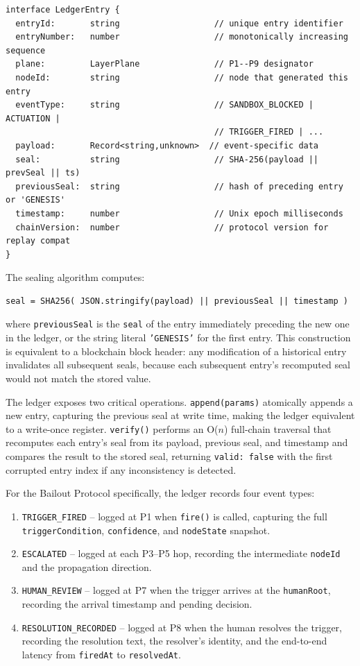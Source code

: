 \begin{verbatim}
interface LedgerEntry {
  entryId:       string                   // unique entry identifier
  entryNumber:   number                   // monotonically increasing sequence
  plane:         LayerPlane               // P1--P9 designator
  nodeId:        string                   // node that generated this entry
  eventType:     string                   // SANDBOX_BLOCKED | ACTUATION |
                                          // TRIGGER_FIRED | ...
  payload:       Record<string,unknown>  // event-specific data
  seal:          string                   // SHA-256(payload || prevSeal || ts)
  previousSeal:  string                   // hash of preceding entry or 'GENESIS'
  timestamp:     number                   // Unix epoch milliseconds
  chainVersion:  number                   // protocol version for replay compat
}
\end{verbatim}

The sealing algorithm computes:

\begin{verbatim}
seal = SHA256( JSON.stringify(payload) || previousSeal || timestamp )
\end{verbatim}

where \texttt{previousSeal} is the \texttt{seal} of the entry immediately preceding the new one in the ledger, or the string literal \texttt{'GENESIS'} for the first entry. This construction is equivalent to a blockchain block header: any modification of a historical entry invalidates all subsequent seals, because each subsequent entry's recomputed seal would not match the stored value.

The ledger exposes two critical operations. \texttt{append(params)} atomically appends a new entry, capturing the previous seal at write time, making the ledger equivalent to a write-once register. \texttt{verify()} performs an O($n$) full-chain traversal that recomputes each entry's seal from its payload, previous seal, and timestamp and compares the result to the stored seal, returning \texttt{valid: false} with the first corrupted entry index if any inconsistency is detected.

For the Bailout Protocol specifically, the ledger records four event types:

\begin{enumerate}
  \item \texttt{TRIGGER\_FIRED} -- logged at P1 when \texttt{fire()} is called, capturing the full \texttt{triggerCondition}, \texttt{confidence}, and \texttt{nodeState} snapshot.
  \item \texttt{ESCALATED} -- logged at each P3--P5 hop, recording the intermediate \texttt{nodeId} and the propagation direction.
  \item \texttt{HUMAN\_REVIEW} -- logged at P7 when the trigger arrives at the \texttt{humanRoot}, recording the arrival timestamp and pending decision.
  \item \texttt{RESOLUTION\_RECORDED} -- logged at P8 when the human resolves the trigger, recording the resolution text, the resolver's identity, and the end-to-end latency from \texttt{firedAt} to \texttt{resolvedAt}.
\end{enumerate}

